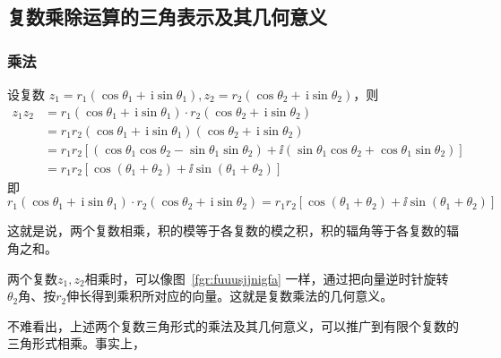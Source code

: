 \documentclass[a4paper,openany]{ctexbook}
\begin{document}
\subsection{复数乘除运算的三角表示及其几何意义}

\subsubsection{乘法}

设复数 \(z_1=r_1(\cos \theta_1 + \,\mathrm{i} \sin \theta _1),z_2=r_2(\cos \theta_2 + \,\mathrm{i} \sin \theta _2)\)，则
\begin{align*}
    z_1z_2 & =r_1(\cos \theta_1 + \,\mathrm{i} \sin \theta _1)\cdot r_2(\cos \theta_2 + \,\mathrm{i} \sin \theta _2)                                   \\
           & =r_1r_2(\cos \theta_1 + \,\mathrm{i} \sin \theta _1)(\cos \theta_2 + \,\mathrm{i} \sin \theta _2)                                         \\
           & =r_1r_2[(\cos \theta _1 \cos \theta _2-\sin \theta _1 \sin \theta _2)+\ii(\sin \theta _1 \cos \theta _2 + \cos \theta _1 \sin \theta _2)] \\
           & =r_1r_2[\cos (\theta _1+\theta _2)+\ii \sin (\theta _1+\theta _2)]
\end{align*}
即
\[
    r_1(\cos \theta_1 + \,\mathrm{i} \sin \theta _1)\cdot r_2(\cos \theta_2 + \,\mathrm{i} \sin \theta _2)
    =r_1r_2[\cos (\theta _1+\theta _2)+\ii \sin (\theta _1+\theta _2)]
\]

这就是说，两个复数相乘，积的模等于各复数的模之积，积的辐角等于各复数的辐角之和。

两个复数\(z_1,z_2\)相乘时，可以像图~\ref{fgr:fuuusjjnigfa} 一样，通过把向量逆时针旋转\(\theta _2\)角、按\(r_2\)伸长得到乘积所对应的向量。这就是复数乘法的几何意义。

不难看出，上述两个复数三角形式的乘法及其几何意义，可以推广到有限个复数的三角形式相乘。事实上，
\end{document}
